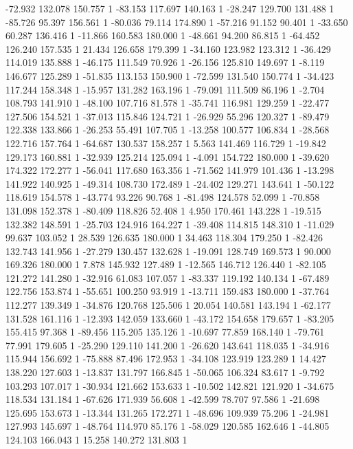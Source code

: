 	-72.932 132.078 150.757 1
	-83.153 117.697 140.163 1
	-28.247 129.700 131.488 1
	-85.726 95.397 156.561 1
	-80.036 79.114 174.890 1
	-57.216 91.152 90.401 1
	-33.650 60.287 136.416 1
	-11.866 160.583 180.000 1
	-48.661 94.200 86.815 1
	-64.452 126.240 157.535 1
	21.434 126.658 179.399 1
	-34.160 123.982 123.312 1
	-36.429 114.019 135.888 1
	-46.175 111.549 70.926 1
	-26.156 125.810 149.697 1
	-8.119 146.677 125.289 1
	-51.835 113.153 150.900 1
	-72.599 131.540 150.774 1
	-34.423 117.244 158.348 1
	-15.957 131.282 163.196 1
	-79.091 111.509 86.196 1
	-2.704 108.793 141.910 1
	-48.100 107.716 81.578 1
	-35.741 116.981 129.259 1
	-22.477 127.506 154.521 1
	-37.013 115.846 124.721 1
	-26.929 55.296 120.327 1
	-89.479 122.338 133.866 1
	-26.253 55.491 107.705 1
	-13.258 100.577 106.834 1
	-28.568 122.716 157.764 1
	-64.687 130.537 158.257 1
	5.563 141.469 116.729 1
	-19.842 129.173 160.881 1
	-32.939 125.214 125.094 1
	-4.091 154.722 180.000 1
	-39.620 174.322 172.277 1
	-56.041 117.680 163.356 1
	-71.562 141.979 101.436 1
	-13.298 141.922 140.925 1
	-49.314 108.730 172.489 1
	-24.402 129.271 143.641 1
	-50.122 118.619 154.578 1
	-43.774 93.226 90.768 1
	-81.498 124.578 52.099 1
	-70.858 131.098 152.378 1
	-80.409 118.826 52.408 1
	4.950 170.461 143.228 1
	-19.515 132.382 148.591 1
	-25.703 124.916 164.227 1
	-39.408 114.815 148.310 1
	-11.029 99.637 103.052 1
	28.539 126.635 180.000 1
	34.463 118.304 179.250 1
	-82.426 132.743 141.956 1
	-27.279 130.457 132.628 1
	-19.091 128.749 169.573 1
	90.000 169.326 180.000 1
	7.878 145.932 127.489 1
	-12.565 146.712 126.440 1
	-82.105 121.272 141.280 1
	-32.916 61.083 107.057 1
	-83.337 119.192 140.134 1
	-67.489 122.756 153.874 1
	-55.651 100.250 93.919 1
	-13.711 159.483 180.000 1
	-37.764 112.277 139.349 1
	-34.876 120.768 125.506 1
	20.054 140.581 143.194 1
	-62.177 131.528 161.116 1
	-12.393 142.059 133.660 1
	-43.172 154.658 179.657 1
	-83.205 155.415 97.368 1
	-89.456 115.205 135.126 1
	-10.697 77.859 168.140 1
	-79.761 77.991 179.605 1
	-25.290 129.110 141.200 1
	-26.620 143.641 118.035 1
	-34.916 115.944 156.692 1
	-75.888 87.496 172.953 1
	-34.108 123.919 123.289 1
	14.427 138.220 127.603 1
	-13.837 131.797 166.845 1
	-50.065 106.324 83.617 1
	-9.792 103.293 107.017 1
	-30.934 121.662 153.633 1
	-10.502 142.821 121.920 1
	-34.675 118.534 131.184 1
	-67.626 171.939 56.608 1
	-42.599 78.707 97.586 1
	-21.698 125.695 153.673 1
	-13.344 131.265 172.271 1
	-48.696 109.939 75.206 1
	-24.981 127.993 145.697 1
	-48.764 114.970 85.176 1
	-58.029 120.585 162.646 1
	-44.805 124.103 166.043 1
	15.258 140.272 131.803 1

